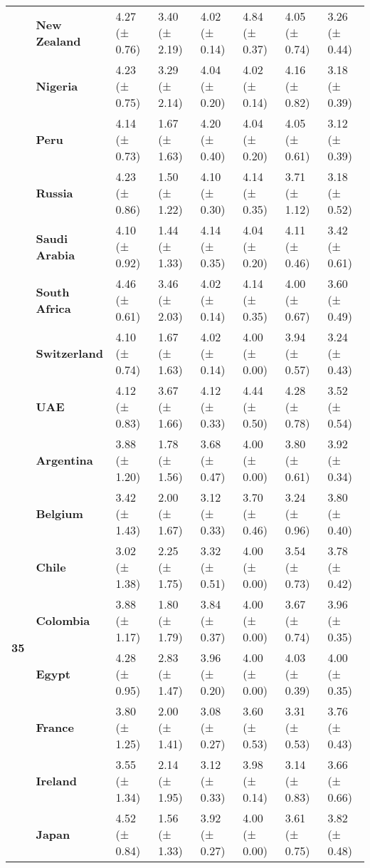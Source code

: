 \begin{tabular}{llllllll}
\textbf{} & \textbf{New Zealand} & 4.27 (± 0.76) & 3.40 (± 2.19) & 4.02 (± 0.14) & 4.84 (± 0.37) & 4.05 (± 0.74) & 3.26 (± 0.44) \\
\textbf{} & \textbf{Nigeria} & 4.23 (± 0.75) & 3.29 (± 2.14) & 4.04 (± 0.20) & 4.02 (± 0.14) & 4.16 (± 0.82) & 3.18 (± 0.39) \\
\textbf{} & \textbf{Peru} & 4.14 (± 0.73) & 1.67 (± 1.63) & 4.20 (± 0.40) & 4.04 (± 0.20) & 4.05 (± 0.61) & 3.12 (± 0.39) \\
\textbf{} & \textbf{Russia} & 4.23 (± 0.86) & 1.50 (± 1.22) & 4.10 (± 0.30) & 4.14 (± 0.35) & 3.71 (± 1.12) & 3.18 (± 0.52) \\
\textbf{} & \textbf{Saudi Arabia} & 4.10 (± 0.92) & 1.44 (± 1.33) & 4.14 (± 0.35) & 4.04 (± 0.20) & 4.11 (± 0.46) & 3.42 (± 0.61) \\
\textbf{} & \textbf{South Africa} & 4.46 (± 0.61) & 3.46 (± 2.03) & 4.02 (± 0.14) & 4.14 (± 0.35) & 4.00 (± 0.67) & 3.60 (± 0.49) \\
\textbf{} & \textbf{Switzerland} & 4.10 (± 0.74) & 1.67 (± 1.63) & 4.02 (± 0.14) & 4.00 (± 0.00) & 3.94 (± 0.57) & 3.24 (± 0.43) \\
\textbf{} & \textbf{UAE} & 4.12 (± 0.83) & 3.67 (± 1.66) & 4.12 (± 0.33) & 4.44 (± 0.50) & 4.28 (± 0.78) & 3.52 (± 0.54) \\
\cline{1-8}
\multirow[t]{19}{*}{\textbf{35}} & \textbf{Argentina} & 3.88 (± 1.20) & 1.78 (± 1.56) & 3.68 (± 0.47) & 4.00 (± 0.00) & 3.80 (± 0.61) & 3.92 (± 0.34) \\
\textbf{} & \textbf{Belgium} & 3.42 (± 1.43) & 2.00 (± 1.67) & 3.12 (± 0.33) & 3.70 (± 0.46) & 3.24 (± 0.96) & 3.80 (± 0.40) \\
\textbf{} & \textbf{Chile} & 3.02 (± 1.38) & 2.25 (± 1.75) & 3.32 (± 0.51) & 4.00 (± 0.00) & 3.54 (± 0.73) & 3.78 (± 0.42) \\
\textbf{} & \textbf{Colombia} & 3.88 (± 1.17) & 1.80 (± 1.79) & 3.84 (± 0.37) & 4.00 (± 0.00) & 3.67 (± 0.74) & 3.96 (± 0.35) \\
\textbf{} & \textbf{Egypt} & 4.28 (± 0.95) & 2.83 (± 1.47) & 3.96 (± 0.20) & 4.00 (± 0.00) & 4.03 (± 0.39) & 4.00 (± 0.35) \\
\textbf{} & \textbf{France} & 3.80 (± 1.25) & 2.00 (± 1.41) & 3.08 (± 0.27) & 3.60 (± 0.53) & 3.31 (± 0.53) & 3.76 (± 0.43) \\
\textbf{} & \textbf{Ireland} & 3.55 (± 1.34) & 2.14 (± 1.95) & 3.12 (± 0.33) & 3.98 (± 0.14) & 3.14 (± 0.83) & 3.66 (± 0.66) \\
\textbf{} & \textbf{Japan} & 4.52 (± 0.84) & 1.56 (± 1.33) & 3.92 (± 0.27) & 4.00 (± 0.00) & 3.61 (± 0.75) & 3.82 (± 0.48) \\

\end{tabular}
